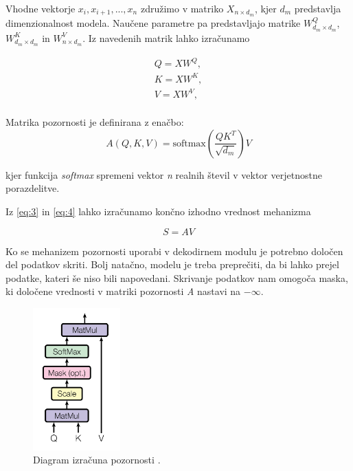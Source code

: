 \documentclass[a4paper,12pt,openright]{book}
\begin{document}
Vhodne vektorje $ x_i, x_{i+1},..., x_{n} $ združimo v matriko $ X_{n \times d_m} $, kjer $ d_m $ predstavlja dimenzionalnost modela. Naučene parametre pa predstavljajo matrike $ W^Q_{d_m \times d_m} $, $ W^K_{d_m \times d_m} $ in $ W^V_{n \times d_m} $. Iz navedenih matrik lahko izračunamo

\begin{equation}
    \begin{split}
        Q = XW^Q, \\
        K = XW^K, \\
        V = XW^V, \\
    \end{split}
    \label{eq:3}
\end{equation}

Matrika pozornosti je definirana z enačbo:
\begin{equation}
    A(Q, K, V) = \text{softmax}(\frac{QK^T}{\sqrt{d_m}})V
    \label{eq:4}
\end{equation}

kjer funkcija \emph{softmax} spremeni vektor \emph{n} realnih števil v vektor verjetnostne porazdelitve.

Iz \ref{eq:3} in \ref{eq:4} lahko izračunamo končno izhodno vrednost mehanizma

\begin{equation}
    S = AV
    \label{eq:5}
\end{equation}


Ko se mehanizem pozornosti uporabi v dekodirnem modulu je potrebno določen del podatkov skriti. Bolj natačno, modelu je treba preprečiti, da bi lahko prejel podatke, kateri še niso bili napovedani. Skrivanje podatkov nam omogoča maska, ki določene vrednosti v matriki pozornosti \emph{A} nastavi na $ -\infty $.


\begin{figure}[htb]
    \begin{center}
        \includegraphics[width=0.3\textwidth]{img/attention.png}
    \end{center}
    \caption{Diagram izračuna pozornosti \cite{attention_is_all_you_need}.}
    \label{img:attention}
\end{figure}
\end{document}
